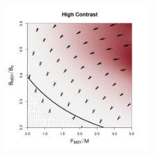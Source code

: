%
\clearpage
\begin{figure}
\begin{minipage}[h!]{0.92\textwidth}
\includegraphics[width=0.49\textwidth]{../ddBias/directionalBiasDDSubExpT45N300A0-1AS10K0.1Reds 2.png}
\end{minipage}
\begin{minipage}[h!]{0.06\textwidth}
\vspace{-7cm}
\hspace*{6cm}

\end{minipage}
\end{figure}
